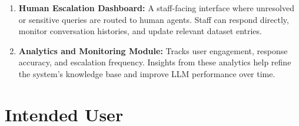 \begin{enumerate}
\begin{itemize}
        \item CSR and corporate partnership information 
        \item Accessibility and support resources 
    \end{itemize}
    \item \textbf{Human Escalation Dashboard:} A staff-facing interface where unresolved or sensitive queries are routed to human agents. Staff can respond directly, monitor conversation histories, and update relevant dataset entries. 
    \item \textbf{Analytics and Monitoring Module:} Tracks user engagement, response accuracy, and escalation frequency. Insights from these analytics help refine the system’s knowledge base and improve LLM performance over time. 
\end{enumerate}

\section{Intended User}

